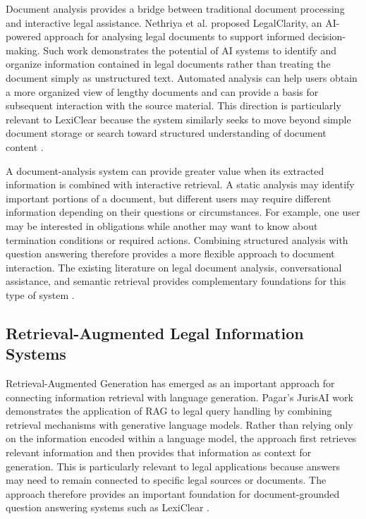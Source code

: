 \documentclass[12pt,a4paper,oneside]{report}
\begin{document}
Document analysis provides a bridge between traditional document processing
and interactive legal assistance. Nethriya et al. proposed LegalClarity, an
AI-powered approach for analysing legal documents to support informed
decision-making. Such work demonstrates the potential of AI systems to
identify and organize information contained in legal documents rather than
treating the document simply as unstructured text. Automated analysis can
help users obtain a more organized view of lengthy documents and can provide
a basis for subsequent interaction with the source material. This direction
is particularly relevant to LexiClear because the system similarly seeks to
move beyond simple document storage or search toward structured
understanding of document content
\cite{nethriya2024}.

A document-analysis system can provide greater value when its extracted
information is combined with interactive retrieval. A static analysis may
identify important portions of a document, but different users may require
different information depending on their questions or circumstances. For
example, one user may be interested in obligations while another may want to
know about termination conditions or required actions. Combining structured
analysis with question answering therefore provides a more flexible approach
to document interaction. The existing literature on legal document analysis,
conversational assistance, and semantic retrieval provides complementary
foundations for this type of system
\cite{nethriya2024,kandula2023,reimers2019sbert}.

\subsection{Retrieval-Augmented Legal Information Systems}

Retrieval-Augmented Generation has emerged as an important approach for
connecting information retrieval with language generation. Pagar's JurisAI
work demonstrates the application of RAG to legal query handling by combining
retrieval mechanisms with generative language models. Rather than relying
only on the information encoded within a language model, the approach first
retrieves relevant information and then provides that information as context
for generation. This is particularly relevant to legal applications because
answers may need to remain connected to specific legal sources or documents.
The approach therefore provides an important foundation for document-grounded
question answering systems such as LexiClear
\cite{jurisai2025}.
\end{document}
